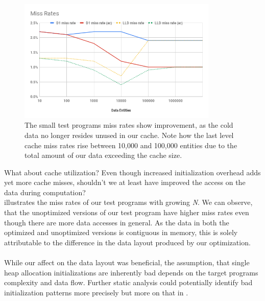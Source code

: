 \begin{figure}[!htbp]
	\centering
	\includegraphics[width=0.85\textwidth, height=0.5\textwidth]{PICs/test_file_miss_rates}
	\caption{The small test programs miss rates show improvement, as the cold data no longer resides unused in our cache. Note how the last level cache miss rates rise between 10,000 and 100,000 entities due to the total amount of our data exceeding the cache size.}
	\label{test_file_miss_rates}
\end{figure}
What about cache utilization? Even though increased initialization overhead adds yet more cache misses, shouldn't we at least have improved the access on the data during computation?\\
 illustrates the miss rates of our test programs with growing \textit{N}. We can observe, that the unoptimized versions of our test program have higher miss rates even though there are more data accesses in general. As the data in both the optimized and unoptimized versions is contiguous in memory, this is solely attributable to the difference in the data layout produced by our optimization.\\\\
While our affect on the data layout was beneficial, the assumption, that single heap allocation initializations are inherently bad depends on the target programs complexity and data flow. Further static analysis could potentially identify bad initialization patterns more precisely but more on that in .

